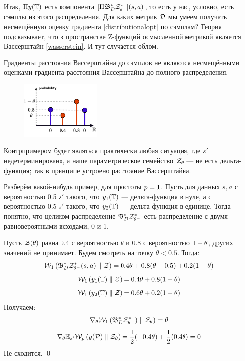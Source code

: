 Итак, $\Pi y(\mathbb{T})$ есть компонента $[\Pi \mathfrak{B}^*_D \mathcal{Z}^*_{\theta^-}](s, a)$, то есть у нас, условно, есть сэмплы из этого распределения. Для каких метрик $\mathcal{D}$ мы умеем получать несмещённую оценку градиента \eqref{distributionalopt} по сэмплам? Теория подсказывает, что в пространстве Z-функций осмысленной метрикой является Вассерштайн \eqref{wasserstein}. И тут случается облом.

\begin{theorem}
Градиенты расстояния Вассерштайна до сэмплов не являются несмещёнными оценками градиента расстояния Вассерштайна до полного распределения.

\begin{figure}
\vspace{-0.3cm}
\centering
\includegraphics[width=0.35\textwidth]{Images/WassersteinSamples.png}
\vspace{-0.6cm}
\end{figure}
\beginproof[Контрпример]
Контрпримером будет являться практически любая ситуация, где $s'$ недетерминировано, а наше параметрическое семейство $\mathcal{Z}_{\theta}$ --- не есть дельта-функция; так в принципе устроено расстояние Вассерштайна.

Разберём какой-нибудь пример, для простоты $p \HM= 1$. Пусть для данных $s, a$ с вероятностью 0.5 $s'$ такого, что $y_1(\mathbb{T})$ --- дельта-функция в нуле, а с вероятностью 0.5 $s'$ такого, что $y_2(\mathbb{T})$ --- дельта-функция в единице. Тогда понятно, что целиком распределение $\mathfrak{B}^*_D \mathcal{Z}^*_{\theta^-}$ есть распределение с двумя равновероятными исходами, 0 и 1. 

Пусть $\mathcal{Z}(\theta)$ равна 0.4 с вероятностью $\theta$ и 0.8 с вероятностью $1 \HM- \theta$, других значений не принимает. Будем смотреть на точку $\theta < 0.5$. Тогда:
$$\mathcal{W}_1 \left( \mathfrak{B}^*_D \mathcal{Z}^*_{\theta^-}(s, a) \parallel \mathcal{Z} \right) = 0.4\theta + 0.8(\theta - 0.5) + 0.2(1 - \theta)$$
$$\mathcal{W}_1 \left( y_1(\mathbb{T}) \parallel \mathcal{Z} \right) = 0.4 \theta + 0.8 (1 - \theta)$$
$$\mathcal{W}_1 \left( y_2(\mathbb{T}) \parallel \mathcal{Z} \right) = 0.6 \theta + 0.2 (1 - \theta)$$
Получаем:
$$\nabla_\theta \mathcal{W}_1 \left( \mathfrak{B}^*_D \mathcal{Z}^*_{\theta^-}) \parallel \mathcal{Z}_{\theta} \right) = \theta$$
$$\nabla_\theta \mathbb{E}_{s'} \mathcal{W}_p \left( y(\mathcal{P}) \parallel \mathcal{Z}_{\theta} \right) = \frac{1}{2} (-0.4\theta) + \frac{1}{2} (0.4\theta) = 0$$
Не сходится. \qed
\end{theorem}

